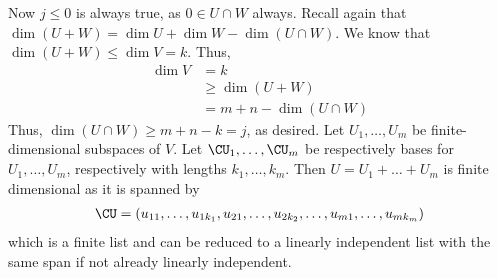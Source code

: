 \documentclass{book}
\begin{document}
\begin{enumerate}[label=\arabic*)]
      Now $j \leq 0$ is always true, as $0 \in U \cap W$ always. Recall again that $\dim(U + W) = \dim U + \dim W - \dim(U \cap W)$. We know that $\dim(U + W) \leq \dim V =
      k$. Thus,
      \begin{align*}
        \dim V 
        & = k \\
        &\geq \dim (U + W) \\
        & = m + n - \dim(U \cap W)
      \end{align*}
      Thus, $\dim(U \cap W) \geq m + n - k = j$, as desired.
    \ii
      Let $U_1, \dots, U_m$ be finite-dimensional subspaces of $V$. Let $\CU_1, \dots, \CU_m$ be respectively bases for $U_1, \dots, U_m$, respectively with lengths $k_1,
      \dots, k_m$. Then $U = U_1 + \dots + U_m$ is finite dimensional as it is spanned by 
      \begin{align*}
        \CU = (u_{11}, \dots, u_{1k_1}, u_{21}, \dots, u_{2k_2}, \dots, u_{m1}, \dots, u_{mk_m}) 
      \end{align*}
      which is a finite list and can be reduced to a linearly independent list with the same span if not already linearly independent. 


\end{enumerate}
\end{document}
